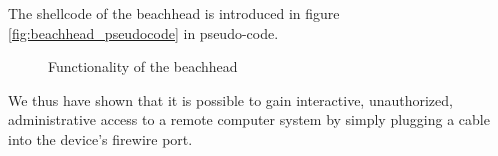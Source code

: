 The shellcode of the beachhead
is introduced in figure \ref{fig:beachhead_pseudocode} in pseudo-code. 

\begin{figure}[htb] \begin{center}

	\epsfysize 5cm


	\caption{Functionality of the beachhead}

	\label{fig:functionality_beachhead}

\end{center}\end{figure}


We thus have shown that it is possible to gain interactive, unauthorized,
administrative access to a remote computer system by simply plugging a cable
into the device's firewire port.

